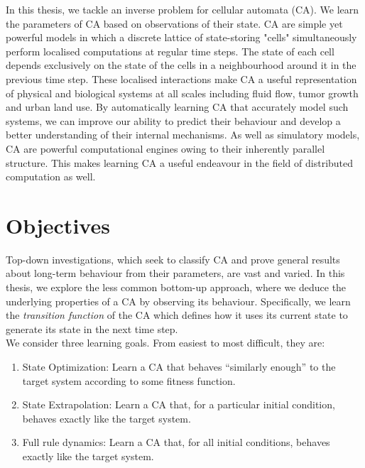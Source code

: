 In this thesis, we tackle an inverse problem for cellular automata (CA). We learn the parameters of CA based on observations of their state. CA are simple yet powerful models in which a discrete lattice of state-storing "cells" simultaneously perform localised computations at regular time steps. The state of each cell depends exclusively on the state of the cells in a neighbourhood around it in the previous time step. These localised interactions make CA a useful representation of physical and biological systems at all scales including fluid flow\cite{wolf2004lattice}, tumor growth\cite{deutsch2021bio, reher2017cell} and urban land use\cite{white2000high}. By automatically learning CA that accurately model such systems, we can improve our ability to predict their behaviour and develop a better understanding of their internal mechanisms. As well as simulatory models, CA are powerful computational engines owing to their inherently parallel structure. This makes learning CA a useful endeavour in the field of distributed computation as well\cite{tosic2005cellular}.\\


\section{Objectives}

Top-down investigations, which seek to classify CA and prove general results about long-term behaviour from their parameters, are vast and varied\cite{packard1985two, wolfram2002,eppstein2010growth}. In this thesis, we explore the less common bottom-up approach, where we deduce the underlying properties of a CA by observing its behaviour. Specifically, we learn the \textit{transition function} of the CA which defines how it uses its current state to generate its state in the next time step.\\

We consider three learning goals. From easiest to most difficult, they are:
\begin{enumerate}
    \item State Optimization: Learn a CA that behaves ``similarly enough'' to the target system according to some fitness function. 
    \item State Extrapolation: Learn a CA that, for a particular initial condition, behaves exactly like the target system.
    \item Full rule dynamics: Learn a CA that, for all initial conditions, behaves exactly like the target system.
\end{enumerate}

